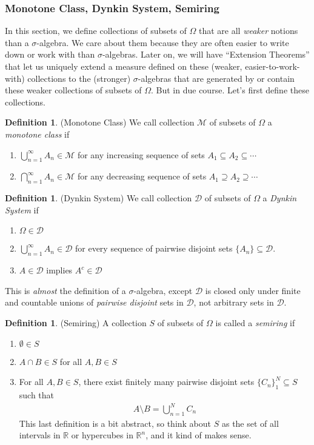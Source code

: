 \documentclass[12pt]{article}
\theoremstyle{plain}
\theoremstyle{definition}
\newtheorem{defn}[thm]{Definition}
\theoremstyle{remark}
\newcommand{\sD}{\mathscr{D}}
\newcommand{\sM}{\mathscr{M}}
\newcommand{\R}{\mathbb{R}}
\newcommand{\Rn}{\mathbb{R}^n}
\newcommand{\ninf}{_{n=1}^\infty}
\newcommand{\nN}{_{n=1}^N}
\begin{document}
\subsubsection{Monotone Class, Dynkin System, Semiring}

In this section, we define collections of subsets of $\Omega$ that are
all \emph{weaker} notions than a $\sigma$-algebra.  We care about them
because they are often easier to write down or work with than
$\sigma$-algebras. Later on, we will have ``Extension Theorems'' that
let us uniquely extend a measure defined on these (weaker,
easier-to-work-with) collections to the (stronger) $\sigma$-algebras
that are generated by or contain these weaker collections of subsets of
$\Omega$. But in due course. Let's first define these collections.

\begin{defn}(Monotone Class)
We call collection $\sM$ of subsets of $\Omega$ a
\emph{monotone class} if
\begin{enumerate}
  \item $\bigcup\ninf A_n \in \sM$ for any increasing sequence of sets
    $A_1\subseteq A_2\subseteq\cdots$
  \item $\bigcap\ninf A_n \in \sM$ for any decreasing sequence of sets
    $A_1\supseteq A_2\supseteq\cdots$
\end{enumerate}
\end{defn}

\begin{defn}(Dynkin System)
We call collection $\sD$ of subsets of $\Omega$ a
\emph{Dynkin System} if
\begin{enumerate}
  \item $\Omega\in\sD$
  \item $\bigcup\ninf A_n \in \sD$ for every sequence of pairwise
    disjoint sets $\{A_n\}\subseteq \sD$.
  \item $A\in\sD$ implies $A^c\in\sD$
\end{enumerate}
This is \emph{almost} the definition of a $\sigma$-algebra, except $\sD$
is closed only under finite and countable unions of \emph{pairwise
disjoint} sets in $\sD$, not arbitrary sets in $\sD$.
\end{defn}


\begin{defn}(Semiring)
A collection $S$ of subsets of $\Omega$ is called a \emph{semiring} if
\begin{enumerate}
  \item $\emptyset \in S$
  \item $A\cap B\in S$ for all $A,B\in S$
  \item For all $A,B\in S$, there exist finitely many pairwise disjoint
    sets $\{C_n\}_1^N\subseteq S$ such that
    \begin{align*}
      A \setminus B = \bigcup\nN C_n
    \end{align*}
    This last definition is a bit abstract, so think about $S$ as the
    set of all intervals in $\R$ or hypercubes in $\Rn$, and it kind of
    makes sense.
\end{enumerate}
\end{defn}
\end{document}
